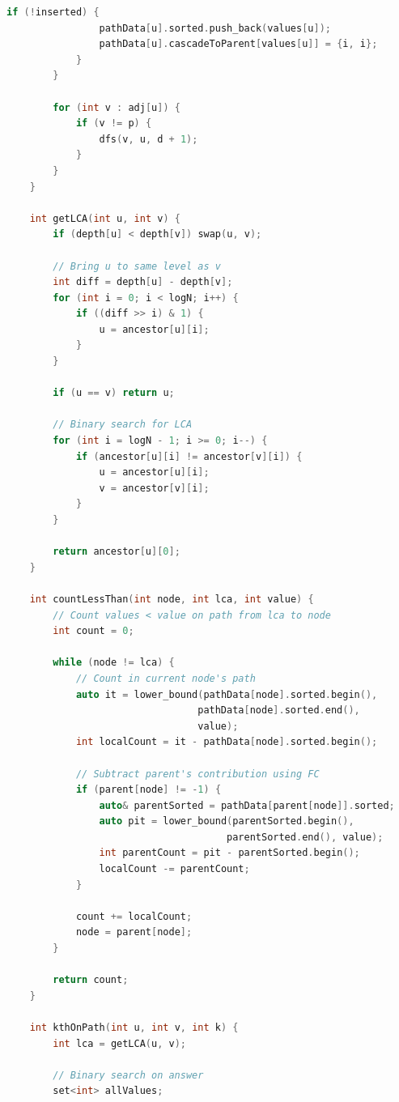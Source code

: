 \documentclass[11pt,a4paper,oneside]{book}
\begin{document}
\begin{lstlisting}[language=C++, caption=Tree Path FC Solutions - Problems 5-7]
            if (!inserted) {
                pathData[u].sorted.push_back(values[u]);
                pathData[u].cascadeToParent[values[u]] = {i, i};
            }
        }
        
        for (int v : adj[u]) {
            if (v != p) {
                dfs(v, u, d + 1);
            }
        }
    }
    
    int getLCA(int u, int v) {
        if (depth[u] < depth[v]) swap(u, v);
        
        // Bring u to same level as v
        int diff = depth[u] - depth[v];
        for (int i = 0; i < logN; i++) {
            if ((diff >> i) & 1) {
                u = ancestor[u][i];
            }
        }
        
        if (u == v) return u;
        
        // Binary search for LCA
        for (int i = logN - 1; i >= 0; i--) {
            if (ancestor[u][i] != ancestor[v][i]) {
                u = ancestor[u][i];
                v = ancestor[v][i];
            }
        }
        
        return ancestor[u][0];
    }
    
    int countLessThan(int node, int lca, int value) {
        // Count values < value on path from lca to node
        int count = 0;
        
        while (node != lca) {
            // Count in current node's path
            auto it = lower_bound(pathData[node].sorted.begin(),
                                 pathData[node].sorted.end(),
                                 value);
            int localCount = it - pathData[node].sorted.begin();
            
            // Subtract parent's contribution using FC
            if (parent[node] != -1) {
                auto& parentSorted = pathData[parent[node]].sorted;
                auto pit = lower_bound(parentSorted.begin(), 
                                      parentSorted.end(), value);
                int parentCount = pit - parentSorted.begin();
                localCount -= parentCount;
            }
            
            count += localCount;
            node = parent[node];
        }
        
        return count;
    }
    
    int kthOnPath(int u, int v, int k) {
        int lca = getLCA(u, v);
        
        // Binary search on answer
        set<int> allValues;
        

\end{lstlisting}
\end{document}
